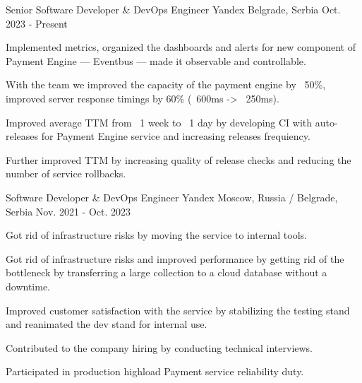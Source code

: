 

\begin{cventries}

  \cventry
    {Senior Software Developer \& DevOps Engineer} %
    {Yandex} %
    {Belgrade, Serbia} %
    {Oct. 2023 - Present} %
    {
      \begin{cvitems} %
        \item {Implemented metrics, organized the dashboards and alerts for new component of Payment Engine — Eventbus — made it observable and controllable.}
        \item {With the team we improved the capacity of the payment engine by ~50\%, improved server response timings by 60\% (~600ms -> ~250ms).}
        \item {Improved average TTM from ~1 week to ~1 day by developing CI with auto-releases for Payment Engine service and increasing releases frequiency.}
        \item {Further improved TTM by increasing quality of release checks and reducing the number of service rollbacks.}
      \end{cvitems}
    }
  \cventry
    {Software Developer \& DevOps Engineer} %
    {Yandex} %
    {Moscow, Russia / Belgrade, Serbia} %
    {Nov. 2021 - Oct. 2023} %
    {
      \begin{cvitems} %
        \item {Got rid of infrastructure risks by moving the service to internal tools.}
        \item {Got rid of infrastructure risks and improved performance by getting rid of the bottleneck by transferring a large collection to a cloud database without a downtime.}
        \item {Improved customer satisfaction with the service by stabilizing the testing stand and reanimated the dev stand for internal use.}
        \item {Contributed to the company hiring by conducting technical interviews.}
        \item {Participated in production highload Payment service reliability duty.}
      \end{cvitems}
}


\end{cventries}
